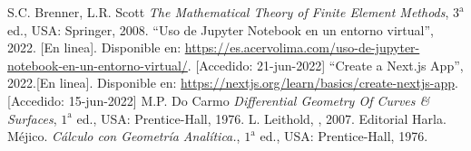 \begin{thebibliography}{99}
	 S.C. Brenner, L.R. Scott
	{\it The Mathematical Theory of Finite Element Methods}, $3^{\text{a}}$ ed., USA: Springer, 2008.
	 ``Uso de Jupyter Notebook en un entorno virtual'', 2022. [En linea]. Disponible en: \url{https://es.acervolima.com/uso-de-jupyter-notebook-en-un-entorno-virtual/}. [Accedido: 21-jun-2022]
	 ``Create a Next.js App'', 2022.[En linea]. Disponible en: \url{https://nextjs.org/learn/basics/create-nextjs-app}. [Accedido: 15-jun-2022]
	 M.P. Do Carmo
	{\it Differential Geometry Of Curves \& Surfaces}, $1^{\text{a}}$ ed., USA: Prentice-Hall, 1976.
	 L. Leithold, , 2007.  Editorial Harla. M\'ejico. 
	{\it C\'alculo con Geometr\'ia Anal\'itica.}, $1^{\text{a}}$ ed., USA: Prentice-Hall, 1976.
\end{thebibliography} 